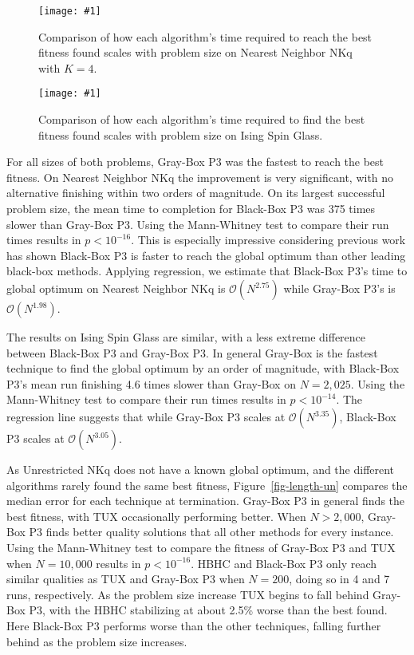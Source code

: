 \documentclass{sig-alternate}
\newcommand{\includegraphicsfit}[1]
{\texttt{[image: \#1]}}
\newcommand{\BigO}[1]{$\mathcal{O}{(#1)}$}
\begin{document}
\begin{figure}
  \centering
  \includegraphicsfit{length-nn}
  \caption{Comparison of how each algorithm's time required to reach the best fitness found scales with problem size
  on Nearest Neighbor NKq with $K=4$.}
  \label{fig-length-nn}
\end{figure}

\begin{figure}
  \centering
  \includegraphicsfit{length-is}
  \caption{Comparison of how each algorithm's time required to find the best fitness found scales with problem size
  on Ising Spin Glass.}
  \label{fig-length-is}
\end{figure}

For all sizes of both problems, Gray-Box P3 was the fastest to reach the best fitness. On
Nearest Neighbor NKq the improvement is very significant, with no alternative finishing within
two orders of magnitude. On its largest successful problem size, the mean time to completion for
Black-Box P3 was 375 times slower than Gray-Box P3. Using the Mann-Whitney test to compare their run times
results in $p < 10^{-16}$. This is especially impressive considering
previous work has shown Black-Box P3 is faster to reach the global optimum than other leading black-box
methods. Applying regression, we estimate that Black-Box P3's time to global optimum
on Nearest Neighbor NKq is \BigO{N^{2.75}} while Gray-Box P3's is \BigO{N^{1.98}}.

The results on Ising Spin Glass are similar, with a less extreme difference between
Black-Box P3 and Gray-Box P3. In general Gray-Box is the fastest technique to
find the global optimum by an order of magnitude, with Black-Box P3's mean run finishing
4.6 times slower than Gray-Box on $N=2,025$. Using the Mann-Whitney test to compare their run times
results in $p < 10^{-14}$. The regression line suggests that while
Gray-Box P3 scales at \BigO{N^{3.35}}, Black-Box P3 scales at \BigO{N^{3.05}}.

As Unrestricted NKq does not have a known global optimum, and the different algorithms
rarely found the same best fitness, Figure~\ref{fig-length-un} compares the median error
for each technique at termination. Gray-Box P3 in general finds the best fitness,
with TUX occasionally performing better. When $N>2,000$, Gray-Box P3 finds better quality
solutions that all other methods for every instance.  Using the Mann-Whitney test to compare the fitness
of Gray-Box P3 and TUX when $N=10,000$ results in $p < 10^{-16}$. HBHC and Black-Box P3 only reach similar
qualities as TUX and Gray-Box P3 when $N=200$, doing so in 4 and 7 runs, respectively. As the problem
size increase TUX begins to fall behind Gray-Box P3, with the HBHC stabilizing at about 2.5\% worse than
the best found. Here Black-Box P3 performs worse than the other techniques,
falling further behind as the problem size increases.
\end{document}
